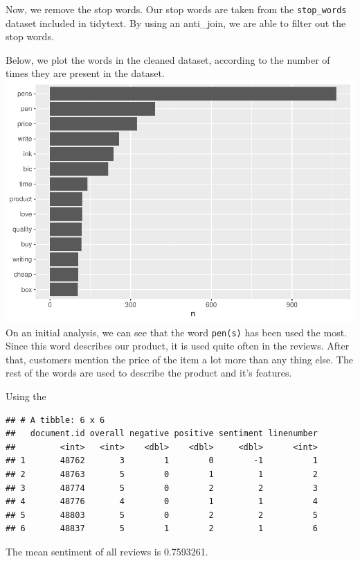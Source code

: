 \documentclass[
  11pt,
]{article}
\begin{document}
Now, we remove the stop words. Our stop words are taken from the
\texttt{stop\_words} dataset included in tidytext. By using an
anti\_join, we are able to filter out the stop words.

Below, we plot the words in the cleaned dataset, according to the number
of times they are present in the dataset.
\includegraphics{Assignment-STAT702_files/figure-latex/preliminary analysis-1.pdf}
On an initial analysis, we can see that the word \texttt{pen(s)} has
been used the most. Since this word describes our product, it is used
quite often in the reviews. After that, customers mention the price of
the item a lot more than any thing else. The rest of the words are used
to describe the product and it's features.

Using the

\begin{verbatim}
## # A tibble: 6 x 6
##   document.id overall negative positive sentiment linenumber
##         <int>   <int>    <dbl>    <dbl>     <dbl>      <int>
## 1       48762       3        1        0        -1          1
## 2       48763       5        0        1         1          2
## 3       48774       5        0        2         2          3
## 4       48776       4        0        1         1          4
## 5       48803       5        0        2         2          5
## 6       48837       5        1        2         1          6
\end{verbatim}

The mean sentiment of all reviews is 0.7593261.
\end{document}

